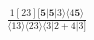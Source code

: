 \documentclass[varwidth, border=5pt]{standalone}
\begin{document}
\begin{my}
$\begin{gathered}
\scriptscriptstyle\frac{1[23][𝟓|𝟓|3⟩⟨4𝟓⟩}{⟨13⟩⟨23⟩⟨3|2+4|3]}
\end{gathered}$
\end{my}
\end{document}
